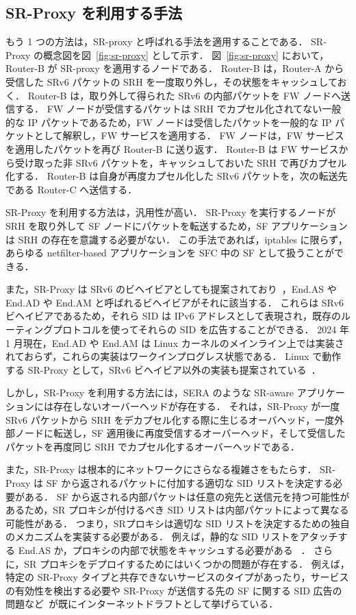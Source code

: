 \subsection*{SR-Proxy を利用する手法}
\label{sbsection:use-sr-proxy}
もう 1 つの方法は，SR-proxy と呼ばれる手法を適用することである．
SR-Proxy の概念図を図~\ref*{fig:sr-proxy} として示す．
図~\ref*{fig:sr-proxy} において，Router-B が SR-proxy を適用するノードである．
Router-B は，Router-A から受信した SRv6 パケットの SRH を一度取り外し，その状態をキャッシュしておく．
Router-B は，取り外して得られた SRv6 の内部パケットを FW ノードへ送信する．
FW ノードが受信するパケットは SRH でカプセル化されてない一般的な IP パケットであるため，FW ノードは受信したパケットを一般的な IP パケットとして解釈し，FW サービスを適用する．
FW ノードは，FW サービスを適用したパケットを再び Router-B に送り返す．
Router-B は FW サービスから受け取った非 SRv6 パケットを，キャッシュしておいた SRH で再びカプセル化する．
Router-B は自身が再度カプセル化した SRv6 パケットを，次の転送先である Router-C へ送信する．

SR-Proxy を利用する方法は，汎用性が高い．
SR-Proxy を実行するノードが SRH を取り外して SF ノードにパケットを転送するため，SF アプリケーションは SRH の存在を意識する必要がない．
この手法であれば，iptables に限らず，あらゆる netfilter-based アプリケーションを SFC 中の SF として扱うことができる．

また，SR-Proxy は SRv6 のビヘイビアとしても提案されており~\cite{filsfils-spring-srv6-interop-02}，End.AS や End.AD や End.AM と呼ばれるビヘイビアがそれに該当する．
これらは SRv6 ビヘイビアであるため，それら SID は IPv6 アドレスとして表現され，既存のルーティングプロトコルを使ってそれらの SID を広告することができる．
2024 年 1 月現在，End.AD や End.AM は Linux カーネルのメインライン上では実装されておらず，これらの実装はワークインプログレス状態である．
Linux で動作する SR-Proxy として，SRv6 ビヘイビア以外の実装も提案されている~\cite{sfc-proxy-bpf,sfc-with-leg-vnf,afxdp-for-srv6}．

しかし，SR-Proxy を利用する方法には，SERA のような SR-aware アプリケーションには存在しないオーバーヘッドが存在する．
それは，SR-Proxy が一度 SRv6 パケットから SRH をデカプセル化する際に生じるオーバヘッド，一度外部ノードに転送し，SF 適用後に再度受信するオーバーヘッド，そして受信したパケットを再度同じ SRH でカプセル化するオーバーヘッドである．

また，SR-Proxy は根本的にネットワークにさらなる複雑さをもたらす．
SR-Proxy は SF から返されるパケットに付加する適切な SID リストを決定する必要がある．
SF から返される内部パケットは任意の宛先と送信元を持つ可能性があるため，SR プロキシが付けるべき SID リストは内部パケットによって異なる可能性がある．
つまり，SRプロキシは適切な SID リストを決定するための独自のメカニズムを実装する必要がある．
例えば，静的な SID リストをアタッチする End.AS か，プロキシの内部で状態をキャッシュする必要がある~\cite{sfc-proxy-bpf} ．
さらに，SR プロキシをデプロイするためにはいくつかの問題が存在する．
例えば，特定の SR-Proxy タイプと共存できないサービスのタイプがあったり，サービスの有効性を検出する必要や SR-Proxy が送信する先の SF に関する SID 広告の問題など~\cite{draft-scexp}が既にインターネットドラフトとして挙げらている．

